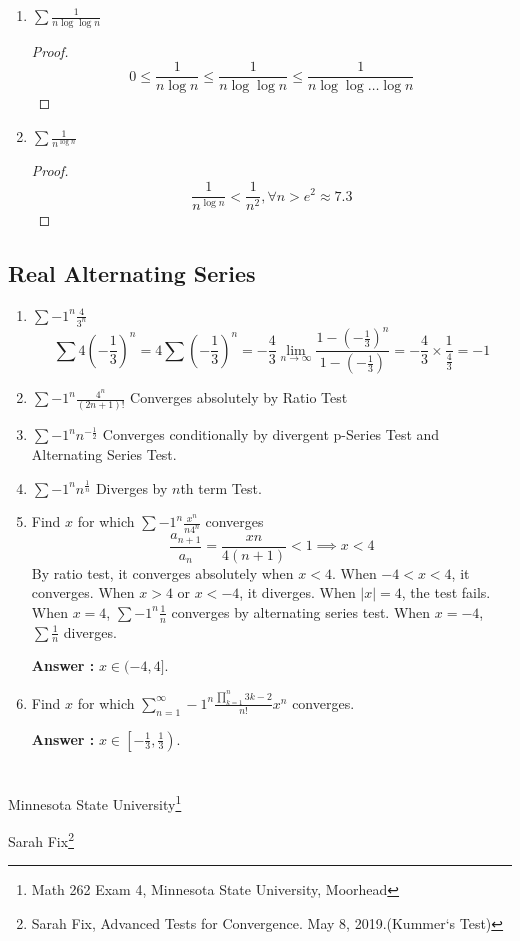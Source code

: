\begin{enumerate}
\begin{proof}
		By condensation test,
		$$ \sum \frac{1}{n\log n}, \sum \frac{2^n}{2^n \log 2^n} = \frac{1}{\log 2} \sum \frac{1}{n} \text{ behaves alike} \implies \sum \frac{1}{\log n} = \infty$$
	\end{proof}
	\item $\sum \frac{1}{n \log \log n}$
	\begin{proof}
		$$ 0 \le \frac{1}{n \log n} \le \frac{1}{n \log \log n} \le \frac{1}{n \log \log \dots \log n} $$
	\end{proof}
	\item $\sum \frac{1}{n^{\log n}}$
	\begin{proof}
	$$\frac{1}{n^{\log n}} < \frac{1}{n^2}, \forall n > e^2 \approx 7.3$$
	\end{proof}
\end{enumerate}

\subsection{Real Alternating Series}
\begin{enumerate}
	\item $\sum -1^n \frac{4}{3^n}$
		$$ \sum 4 \left(-\frac{1}{3}\right)^n = 4 \sum \left(-\frac{1}{3}\right)^n = -\frac{4}{3} \lim_{n \to \infty} \frac{1-(-\frac{1}{3})^n}{1-(-\frac{1}{3})} = -\frac{4}{3} \times \frac{1}{\frac{4}{3}} = -1 $$
	\item $\sum -1^n \frac{4^n}{(2n+1)!}$
		Converges absolutely by Ratio Test
	\item $\sum -1^n n^{-\frac{1}{2}}$
		Converges conditionally by divergent p-Series Test and Alternating Series Test.
	\item $\sum -1^n n^\frac{1}{n}$
		Diverges by $n$th term Test.
	\item Find $x$ for which $\sum -1^n \frac{x^n}{n4^n}$ converges
		$$ \frac{a_{n+1}}{a_n} = \frac{xn}{4(n+1)} < 1 \implies x < 4 $$
		By ratio test, it converges absolutely when $x < 4$. When $-4<x<4$, it converges. When $x > 4$ or $x < -4$, it diverges. When $|x|=4$, the test fails.
		When $x = 4$, $\sum -1^n \frac{1}{n}$ converges by alternating series test.
		When $x = -4$, $\sum \frac{1}{n}$ diverges.

		\textbf{Answer :} $x \in (-4,4]$.
	\item Find $x$ for which  $\displaystyle \sum_{n=1}^\infty -1^n \frac{\displaystyle \prod_{k=1}^n 3k-2}{n!} x^n$ converges.

		\textbf{Answer :} $x \in \left[-\frac{1}{3},\frac{1}{3}\right)$.
\end{enumerate}

\section*{}
\begin{enumerate*}[label = Source \arabic*]
	\item Minnesota State University\footnote{Math 262 Exam 4, Minnesota State University, Moorhead}\\
	\item Sarah Fix\footnote{Sarah Fix, Advanced Tests for Convergence. May 8, 2019.(Kummer`s Test)}
\end{enumerate*}

